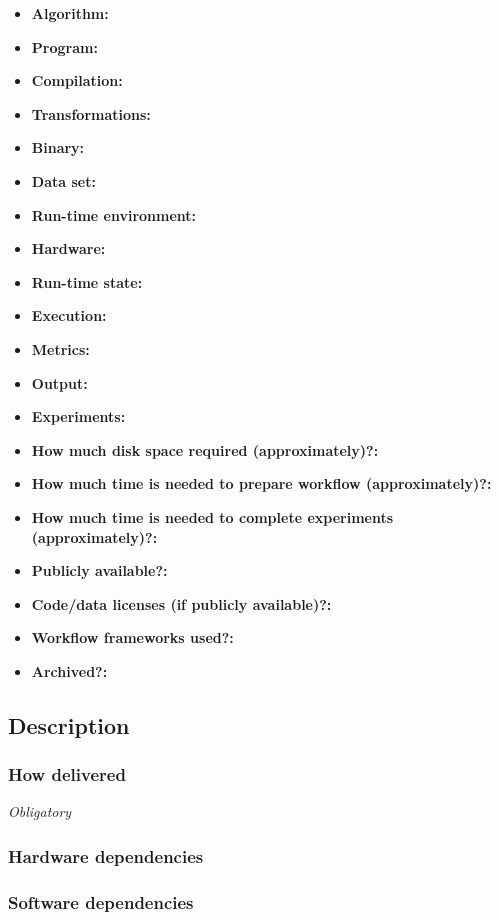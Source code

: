 \documentclass{sigplanconf}
\begin{document}
{\small
\begin{itemize}
  \item {\bf Algorithm: }
  \item {\bf Program: }
  \item {\bf Compilation: }
  \item {\bf Transformations: }
  \item {\bf Binary: }
  \item {\bf Data set: }
  \item {\bf Run-time environment: }
  \item {\bf Hardware: }
  \item {\bf Run-time state: }
  \item {\bf Execution: }
  \item {\bf Metrics: }
  \item {\bf Output: }
  \item {\bf Experiments: }
  \item {\bf How much disk space required (approximately)?: }
  \item {\bf How much time is needed to prepare workflow (approximately)?: }
  \item {\bf How much time is needed to complete experiments (approximately)?: }
  \item {\bf Publicly available?: }
  \item {\bf Code/data licenses (if publicly available)?: }
  \item {\bf Workflow frameworks used?: }
  \item {\bf Archived?: }
\end{itemize}

\subsection{Description}

\subsubsection{How delivered}

{\em Obligatory}

\subsubsection{Hardware dependencies}

\subsubsection{Software dependencies}

}
\end{document}
